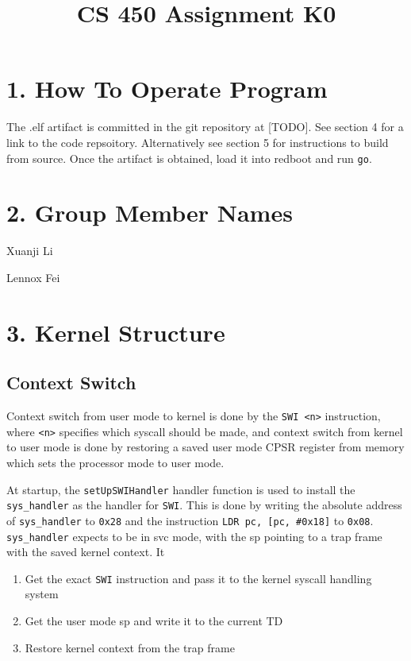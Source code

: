 \documentclass{article}
\title{CS 450 Assignment K0}
\date{}
\begin{document}
\maketitle


\section*{1. How To Operate Program}

The .elf artifact is committed in the git repository at [TODO]. See section 4 for a link to the code repsoitory. Alternatively see section 5 for instructions to build from source. Once the artifact is obtained, load it into redboot and run \texttt{go}.

\section*{2. Group Member Names}

Xuanji Li

Lennox Fei

\section*{3. Kernel Structure}

\subsection*{Context Switch}

Context switch from user mode to kernel is done by the \texttt{SWI <n>} instruction, where \texttt{<n>} specifies which syscall should be made, and context switch from kernel to user mode is done by restoring a saved user mode CPSR register from memory which sets the processor mode to user mode.

At startup, the \texttt{setUpSWIHandler} handler function is used to install the \texttt{sys\_handler} as the handler for \texttt{SWI}. This is done by writing the absolute address of \texttt{sys\_handler} to \texttt{0x28} and the instruction \texttt{LDR pc, [pc, \#0x18]} to \texttt{0x08}. \texttt{sys\_handler} expects to be in svc mode, with the sp pointing to a trap frame with the saved kernel context. It

\begin{enumerate}
\item Get the exact \texttt{SWI} instruction and pass it to the kernel syscall handling system
\item Get the user mode sp and write it to the current TD
\item Restore kernel context from the trap frame
\end{enumerate}
\end{document}

